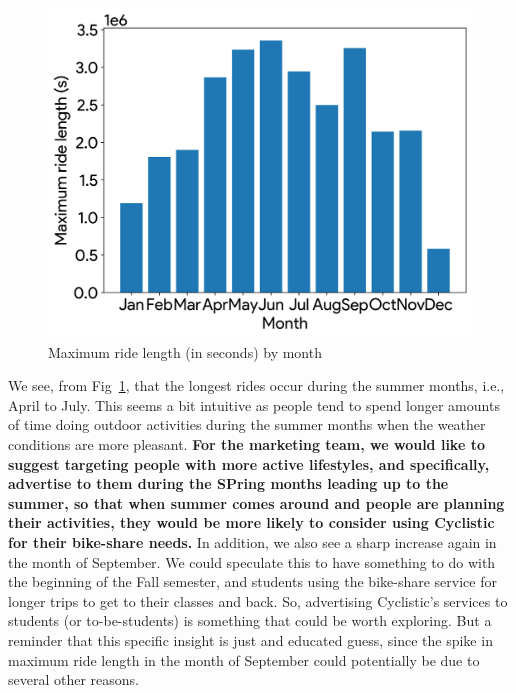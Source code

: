 \documentclass{article}
\begin{document}
\begin{figure}[h]
  \centering
  \includegraphics[width=\textwidth]{figs/ride_max_month}
  \caption{Maximum ride length (in seconds) by month}
  \label{fig:ride_max_month}
\end{figure}


We see, from Fig~\ref{fig:ride_max_month}, that the longest rides occur during the summer months, i.e., April to July. This seems a bit intuitive as people tend to spend longer amounts of time doing outdoor activities during the summer months when the weather conditions are more pleasant. \textbf{For the marketing team, we would like to suggest targeting people with more active lifestyles, and specifically, advertise to them during the SPring months leading up to the summer, so that when summer comes around and people are planning their activities, they would be more likely to consider using Cyclistic for their bike-share needs.} In addition, we also see a sharp increase again in the month of September. We could speculate this to have something to do with the beginning of the Fall semester, and students using the bike-share service for longer trips to get to their classes and back. So, advertising Cyclistic's services to students (or to-be-students) is something that could be worth exploring. But a reminder that this specific insight is just and educated guess, since the spike in maximum ride length in the month of September could potentially be due to several other reasons.
\end{document}
